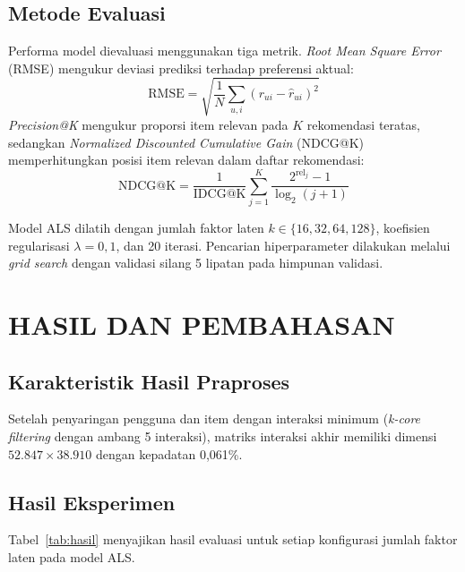 \documentclass[12pt,a4paper]{report}
\begin{document}
\begin{onehalfspace}
\section{Metode Evaluasi}
Performa model dievaluasi menggunakan tiga metrik. \emph{Root Mean Square
Error} (RMSE) mengukur deviasi prediksi terhadap preferensi aktual:
\begin{equation}
\text{RMSE} = \sqrt{\frac{1}{N}\sum_{u,i}\left(r_{ui} -
\hat{r}_{ui}\right)^2}
\label{eq:rmse}
\end{equation}
\emph{Precision@K} mengukur proporsi item relevan pada $K$ rekomendasi
teratas, sedangkan \emph{Normalized Discounted Cumulative Gain} (NDCG@K)
memperhitungkan posisi item relevan dalam daftar rekomendasi:
\begin{equation}
\text{NDCG@K} = \frac{1}{\text{IDCG@K}} \sum_{j=1}^{K}
\frac{2^{\text{rel}_j} - 1}{\log_2(j+1)}
\label{eq:ndcg}
\end{equation}

\begin{tcolorbox}[infobox, title={\faCogs\ Konfigurasi Eksperimen}]
Model ALS dilatih dengan jumlah faktor laten $k \in \{16, 32, 64, 128\}$,
koefisien regularisasi $\lambda = 0{,}1$, dan 20 iterasi. Pencarian
hiperparameter dilakukan melalui \emph{grid search} dengan validasi silang
5 lipatan pada himpunan validasi.
\end{tcolorbox}

\chapter{HASIL DAN PEMBAHASAN}

\section{Karakteristik Hasil Praproses}
Setelah penyaringan pengguna dan item dengan interaksi minimum (\emph{k-core
filtering} dengan ambang 5 interaksi), matriks interaksi akhir memiliki
dimensi $52.847 \times 38.910$ dengan kepadatan 0,061\%.

\section{Hasil Eksperimen}
Tabel~\ref{tab:hasil} menyajikan hasil evaluasi untuk setiap konfigurasi
jumlah faktor laten pada model ALS.


\end{onehalfspace}
\end{document}
